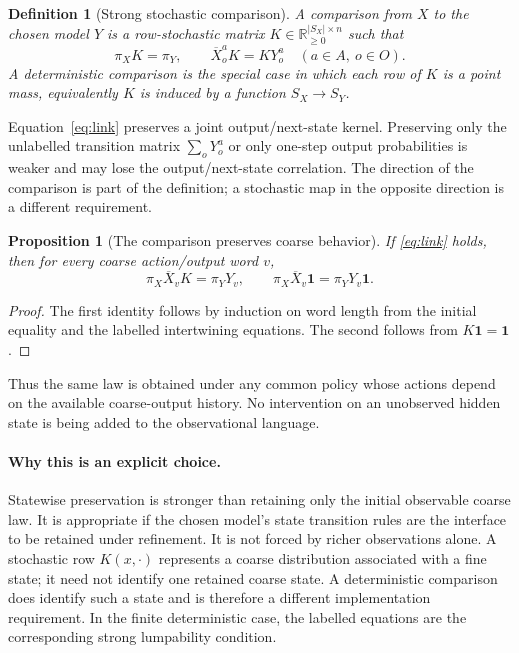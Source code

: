 \documentclass[11pt]{article}
\newtheorem{proposition}[theorem]{Proposition}
\newtheorem{definition}[theorem]{Definition}
\newcommand{\one}{\mathbf{1}}
\newcommand{\R}{\mathbb{R}}
\begin{document}
\begin{definition}[Strong stochastic comparison]
A comparison from $X$ to the chosen model $Y$ is a row-stochastic matrix $K\in\R_{\geq0}^{|S_X|\times n}$ such that
\begin{equation}
 \pi_XK=\pi_Y,
 \qquad \overline X_o^a K=K Y_o^a
 \quad(a\in A,\ o\in O).
 \label{eq:link}
\end{equation}
A deterministic comparison is the special case in which each row of $K$ is a point mass, equivalently $K$ is induced by a function $S_X\to S_Y$.
\end{definition}

Equation~\eqref{eq:link} preserves a joint output/next-state kernel. Preserving only the unlabelled transition matrix $\sum_oY_o^a$ or only one-step output probabilities is weaker and may lose the output/next-state correlation. The direction of the comparison is part of the definition; a stochastic map in the opposite direction is a different requirement.

\begin{proposition}[The comparison preserves coarse behavior]
If \eqref{eq:link} holds, then for every coarse action/output word $v$,
\[
 \pi_X\overline X_v K=\pi_Y Y_v,
 \qquad \pi_X\overline X_v\one=\pi_Y Y_v\one.
\]
\end{proposition}
\begin{proof}
The first identity follows by induction on word length from the initial equality and the labelled intertwining equations. The second follows from $K\one=\one$.
\end{proof}
Thus the same law is obtained under any common policy whose actions depend on the available coarse-output history. No intervention on an unobserved hidden state is being added to the observational language.

\paragraph{Why this is an explicit choice.}
Statewise preservation is stronger than retaining only the initial observable coarse law. It is appropriate if the chosen model's state transition rules are the interface to be retained under refinement. It is not forced by richer observations alone. A stochastic row $K(x,\cdot)$ represents a coarse distribution associated with a fine state; it need not identify one retained coarse state. A deterministic comparison does identify such a state and is therefore a different implementation requirement. In the finite deterministic case, the labelled equations are the corresponding strong lumpability condition.
\end{document}
